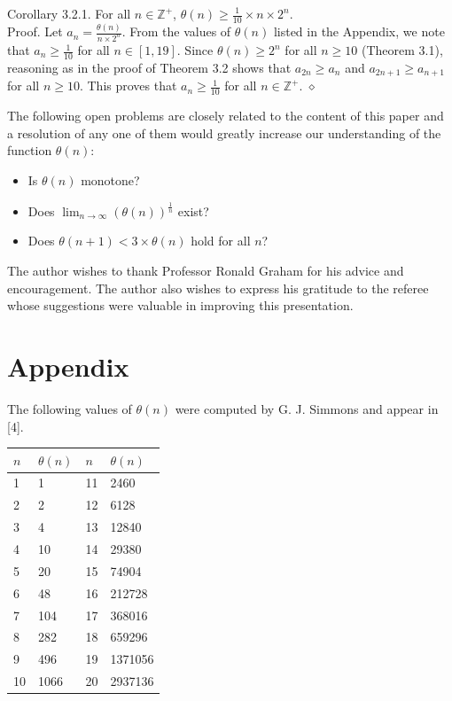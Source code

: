 \documentclass[10pt]{article}
\newcommand{\proofend}{\hfill\(\diamond\)}
\begin{document}
Corollary 3.2.1. For all $n \in \mathbb{Z}^{+}$, $\theta(n) \geq \frac{1}{10} \times n \times 2^{n}$.\\
Proof. Let $a_{n}=\frac{\theta(n)}{n \times 2^{n}}$. From the values of $\theta(n)$ listed in the Appendix, we note that $a_{n} \geq \frac{1}{10}$ for all $n \in [1,19]$. Since $\theta(n) \geq 2^{n}$ for all $n \geq 10$ (Theorem 3.1), reasoning as in the proof of Theorem 3.2 shows that $a_{2 n} \geq a_{n}$ and $a_{2 n+1} \geq a_{n+1}$ for all $n \geq 10$. This proves that $a_{n} \geq \frac{1}{10}$ for all $n \in \mathbb{Z}^{+}$. \proofend

The following open problems are closely related to the content of this paper and a resolution of any one of them would greatly increase our understanding of the function $\theta(n)$:

\begin{itemize}
  \item[(1)] Is $\theta(n)$ monotone?
  \item[(2)] Does $\lim _{n \rightarrow \infty}(\theta(n))^{\frac{1}{n}}$ exist?
  \item[(3)] Does $\theta(n+1)<3 \times \theta(n)$ hold for all $n$?
\end{itemize}

The author wishes to thank Professor Ronald Graham for his advice and encouragement. The author also wishes to express his gratitude to the referee whose suggestions were valuable in improving this presentation.

\section*{Appendix}
The following values of $\theta(n)$ were computed by G. J. Simmons and appear in [4].

\begin{center}
\begin{tabular}[t]{|l|l|l|l|}
\hline
$n$ & $\theta(n)$ & $n$ & $\theta(n)$ \\
\hline
1 & 1 & 11 & 2460 \\
\hline
2 & 2 & 12 & 6128 \\
\hline
3 & 4 & 13 & 12840 \\
\hline
4 & 10 & 14 & 29380 \\
\hline
5 & 20 & 15 & 74904 \\
\hline
6 & 48 & 16 & 212728 \\
\hline
7 & 104 & 17 & 368016 \\
\hline
8 & 282 & 18 & 659296 \\
\hline
9 & 496 & 19 & 1371056 \\
\hline
10 & 1066 & 20 & 2937136 \\
\hline
\end{tabular}
\end{center}
\end{document}
